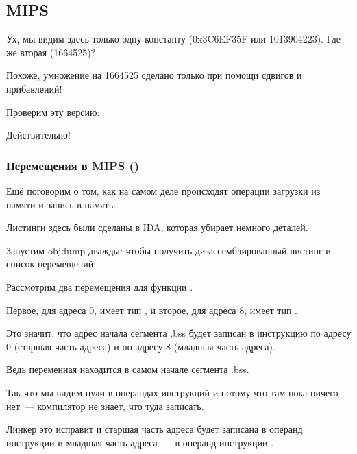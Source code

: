 \subsection{MIPS}



Ух, мы видим здесь только одну константу (0x3C6EF35F или 1013904223).
Где же вторая (1664525)?

Похоже, умножение на 1664525 сделано только при помощи сдвигов и прибавлений!

Проверим эту версию:





Действительно!

\subsubsection{Перемещения в MIPS ()}

Ещё поговорим о том, как на самом деле происходят операции загрузки из памяти и запись в память.

Листинги здесь были сделаны в IDA, которая убирает немного деталей.

Запустим objdump дважды: чтобы получить дизассемблированный листинг и список перемещений:



Рассмотрим два перемещения для функции .

Первое, для адреса 0, имеет тип , и второе, для адреса 8, имеет тип .

Это значит, что адрес начала сегмента .bss будет записан в инструкцию по адресу 0 (старшая часть адреса)
и по адресу 8 (младшая часть адреса).

Ведь переменная  находится в самом начале сегмента .bss.

Так что мы видим нули в операндах инструкций \LUI и \SW потому что там пока ничего нет~--- 
компилятор не знает, что туда записать.

Линкер это исправит и старшая часть адреса будет записана в операнд инструкции \LUI и младшая часть адреса~---
в операнд инструкции \SW.

